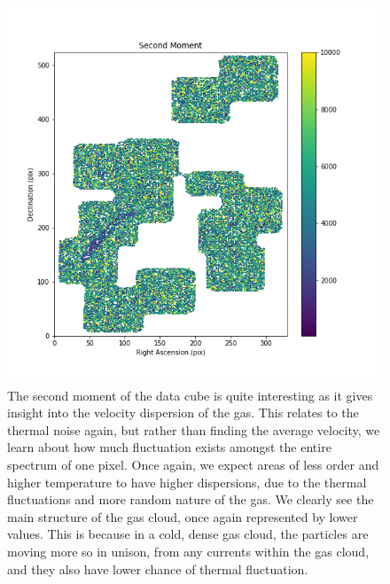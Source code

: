 \documentclass{article}
\begin{document}
\begin{figure}
    \centering
    \includegraphics[width=0.8\linewidth]{Photos/M_2.png}
    \caption{The second moment of the data cube is quite interesting as it gives insight into the velocity dispersion of the gas. This relates to the thermal noise again, but rather than finding the average velocity, we learn about how much fluctuation exists amongst the entire spectrum of one pixel. Once again, we expect areas of less order and higher temperature to have higher dispersions, due to the thermal fluctuations and more random nature of the gas. We clearly see the main structure of the gas cloud, once again represented by lower values. This is because in a cold, dense gas cloud, the particles are moving more so in unison, from any currents within the gas cloud, and they also have lower chance of thermal fluctuation.}
    \label{fig:M2}
\end{figure}
\end{document}
